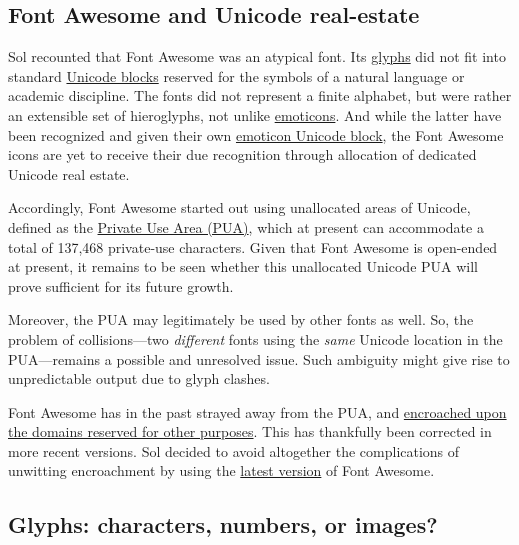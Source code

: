 \documentclass[
  british,
  a4paper,
  rgb,
  dvipsnames,
  svgnames,
  hyphens]{article}
\begin{document}
\hypertarget{font-awesome-and-unicode-real-estate}{%
\subsection{Font Awesome and Unicode
real-estate}\label{font-awesome-and-unicode-real-estate}}

Sol recounted that Font Awesome was an atypical font. Its
\href{https://en.wikipedia.org/wiki/Glyph}{glyphs} did not fit into
standard \href{https://en.wikipedia.org/wiki/Unicode_block}{Unicode
blocks} reserved for the symbols of a natural language or academic
discipline. The fonts did not represent a finite alphabet, but were
rather an extensible set of hieroglyphs, not unlike
\href{https://en.wikipedia.org/wiki/Emoticon}{emoticons}. And while the
latter have been recognized and given their own
\href{https://en.wikipedia.org/wiki/Emoticons_(Unicode_block)}{emoticon
Unicode block}, the Font Awesome icons are yet to receive their due
recognition through allocation of dedicated Unicode real estate.

Accordingly, Font Awesome started out using unallocated areas of
Unicode, defined as the
\href{https://www.unicode.org/faq/private_use.html}{Private Use Area
(PUA)}, which at present can accommodate a total of 137,468 private-use
characters. Given that Font Awesome is open-ended at present, it remains
to be seen whether this unallocated Unicode PUA will prove sufficient
for its future growth.

Moreover, the PUA may legitimately be used by other fonts as well. So,
the problem of collisions---two \emph{different} fonts using the
\emph{same} Unicode location in the PUA---remains a possible and
unresolved issue. Such ambiguity might give rise to unpredictable output
due to glyph clashes.

Font Awesome has in the past strayed away from the PUA, and
\href{https://fontawesome.com/v5.15/how-to-use/on-the-web/advanced/css-pseudo-elements}{encroached
upon the domains reserved for other purposes}. This has thankfully been
corrected in more recent versions. Sol decided to avoid altogether the
complications of unwitting encroachment by using the
\href{https://fontawesome.com/download\#}{latest version} of Font
Awesome.

\hypertarget{glyphs-characters-numbers-or-images}{%
\subsection{Glyphs: characters, numbers, or
images?}\label{glyphs-characters-numbers-or-images}}
\end{document}
